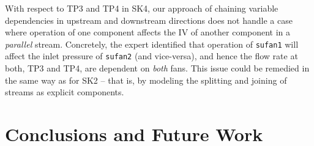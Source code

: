 \documentclass[sigconf]{acmart}
\begin{document}
With respect to TP3 and TP4 in SK4, our approach of chaining variable dependencies in upstream and downstream directions does not handle a case where operation of one component affects the IV of another component in a \emph{parallel} stream.
Concretely, the expert identified that operation of \texttt{sufan1} will affect the inlet pressure of \texttt{sufan2} (and vice-versa), and hence the flow rate at both, TP3 and TP4, are dependent on \emph{both} fans.
This issue could be remedied in the same way as for SK2 -- that is, by modeling the splitting and joining of streams as explicit components.




\section{Conclusions and Future Work}

\end{document}
